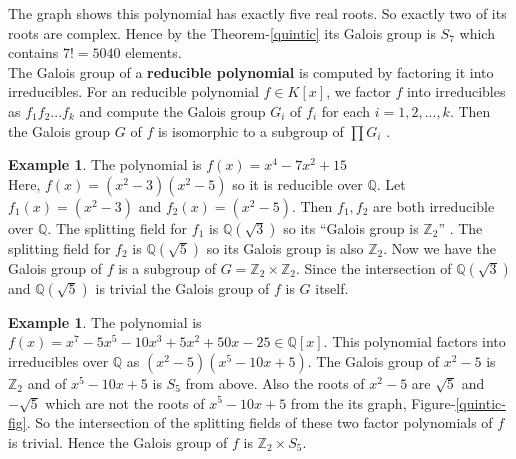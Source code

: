 \documentclass[a4paper,twoside,10pt]{article}
\theoremstyle{plain}
\theoremstyle{definition}
\newtheorem{example}[theorem]{Example}
\begin{document}
\noindent
The graph shows this polynomial has exactly five real roots. So exactly two of its roots are complex. Hence by the Theorem-\ref{quintic} its Galois group is \(S_7\) which contains \(7!=5040\) elements. \\[4mm]

\noindent
The Galois group of a \textbf{reducible polynomial} is computed by factoring it into irreducibles. For an reducible polynomial \(f \in K[x]\), we factor \(f\) into irreducibles as \(f_1f_2...f_k\) and compute the Galois group \(G_i\)  of \(f_i\) for each \(i=1,2,...,k\). Then the Galois group \(G\) of \(f\) is isomorphic to a subgroup of \(\prod G_i\) \cite{algorithm}.

\begin{example}
  The polynomial is \(f(x) = x^4-7x^2+15\)\\
  Here, \(f(x)=(x^2-3)(x^2-5)\) so it is reducible over \(\mathbb{Q}\). Let \(f_1(x)=(x^2-3)\) and \(f_2(x)=(x^2-5)\). Then \(f_1,f_2\) are both irreducible over \(\mathbb{Q}\). The splitting field for \(f_1\) is \(\mathbb{Q}(\sqrt{3})\) so its ``Galois group is \({\mathbb{Z}}_2\)'' \cite{hunger}. The splitting field for \(f_2\) is \(\mathbb{Q}(\sqrt{5})\) so its Galois group is also \({\mathbb{Z}}_2\). Now we have the Galois group of \(f\) is a subgroup of \(G={\mathbb{Z}}_2 \times {\mathbb{Z}}_2\). Since the intersection of \(\mathbb{Q}(\sqrt{3})\) and \(\mathbb{Q}(\sqrt{5})\) is trivial the Galois group of \(f\) is \(G\) itself.
\end{example}

\begin{example}
  The polynomial is \(f(x)=x^7-5x^5-10x^3+5x^2+50x-25 \in \mathbb{Q}[x]\). This polynomial factors into irreducibles over \(\mathbb{Q}\) as \((x^2-5)(x^5-10x+5)\). The Galois group of \(x^2-5\) is \({\mathbb{Z}}_2\) \cite{algorithm} and of \(x^5-10x+5\) is \(S_5\) from above. Also the roots of \(x^2-5\) are \(\sqrt{5}\) and \(-\sqrt{5}\) which are not the roots of \(x^5-10x+5\) from the its graph, Figure-\ref{quintic-fig}. So the intersection of the splitting fields of these two factor polynomials of \(f\) is trivial. Hence the Galois group of \(f\) is \(\mathbb{Z}_2 \times S_5\).
\end{example}
\end{document}
